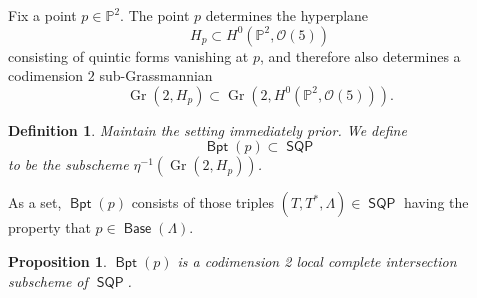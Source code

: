 \documentclass[reqno, 11pt]{amsart}
\theoremstyle{plain}
\newtheorem{proposition}[theorem]{Proposition}
\newtheorem{definition}[theorem]{Definition}
\theoremstyle{remark}
\renewcommand{\P}{\mathbb{P}}
\renewcommand{\O}{\mathcal{O}}
\DeclareMathOperator{\SQP}{\mathsf{SQP}}
\DeclareMathOperator{\Gr}{Gr}
\DeclareMathOperator{\BP}{\mathsf{Bpt}}
\DeclareMathOperator{\Base}{\mathsf{Base}}
\begin{document}
Fix a point $p \in \P^{2}$.  The point $p$ determines the hyperplane
\[H_{p} \subset H^{0}(\P^{2}, \O(5))\] consisting of quintic forms vanishing at $p$,
and therefore also determines a codimension $2$ sub-Grassmannian
\[\Gr\left(2, H_{p}\right) \subset \Gr\left(2, H^{0}\left(\P^{2}, \O(5)\right)\right).\]

\begin{definition}
  \label{definition:basepointp} Maintain the setting immediately
  prior. We define \[\BP (p) \subset \SQP\] to be
  the subscheme $\eta^{-1}\left(\Gr(2,H_p)\right)$.
\end{definition}
As a set, $\BP (p)$ consists of those triples
$(T,T^{*},\Lambda) \in \SQP$ having the property that $p \in \Base(\Lambda)$.

\begin{proposition}
  \label{proposition:BPp}
  $\BP (p)$ is a codimension 2 local complete intersection subscheme
  of $\SQP$.
\end{proposition}
\end{document}
